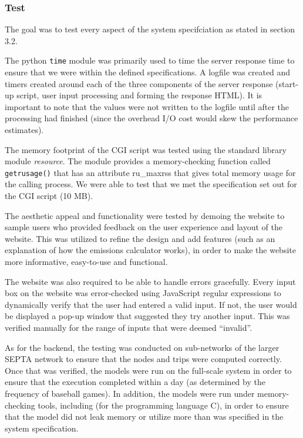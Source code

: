 
\subsubsection{Test}
The goal was to test every aspect of the system specifciation as
stated in section 3.2.

The python \texttt{time} module was primarily used to time the server
response time to ensure that we were within the defined
specifications.  A logfile was created and timers created around each
of the three components of the server response (start-up script, user
input processing and forming the response HTML). It is important to
note that the values were not written to the logfile until after the
processing had finished (since the overhead I/O cost would skew the
performance estimates).

The memory footprint of the CGI script was tested using the standard
library module \emph{resource}. The module provides a memory-checking
function called \texttt{getrusage()} \cite{php-memory} that has an
attribute ru_maxrss that gives total memory usage for the calling
process. We were able to test that we met the specification set out
for the CGI script (10 MB).

The aesthetic appeal and functionality were tested by demoing the
website to sample users who provided feedback on the user experience
and layout of the website. This was utilized to refine the design and
add features (such as an explanation of how the emissions calculator
works), in order to make the website more informative, easy-to-use and
functional.

The website was also required to be able to handle errors
gracefully. Every input box on the website was error-checked using
JavaScript regular expressions to dynamically verify that the user had
entered a valid input. If not, the user would be displayed a pop-up
window that suggested they try another input. This was verified
manually for the range of inputs that were deemed ``invalid''.

As for the backend, the testing was conducted on sub-networks of the
larger SEPTA network to ensure that the nodes and trips were computed
correctly. Once that was verified, the models were run on the
full-scale system in order to ensure that the execution completed
within a day (as determined by the frequency of baseball games). In
addition, the models were run under memory-checking tools, including
 (for the programming language C), in order to ensure that the
model did not leak memory or utilize more than was specified in the
system specification.

